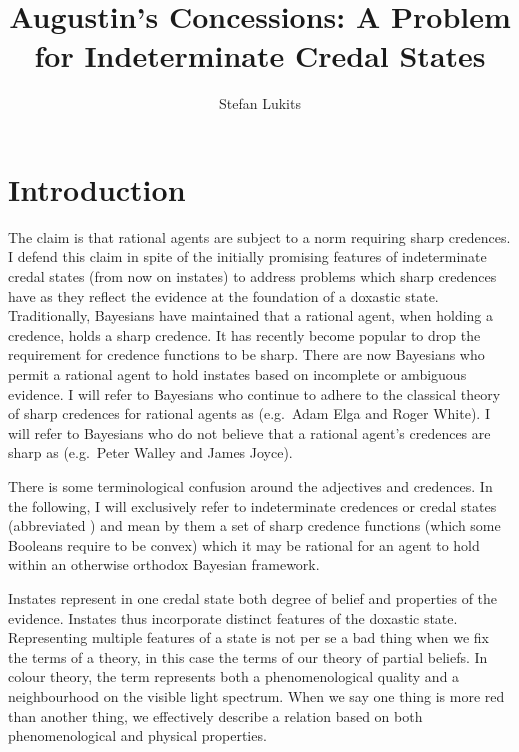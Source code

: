 \documentclass[11pt]{article}
\begin{document}

\title{Augustin's Concessions: A Problem for Indeterminate Credal States}
\author{Stefan Lukits}
\date{}
\maketitle


\section{Introduction}
\label{Introduction}

The claim is that rational agents are subject to a norm requiring
sharp credences. I defend this claim in spite of the initially
promising features of indeterminate credal states (from now on
instates) to address problems which sharp credences have as they
reflect the evidence at the foundation of a doxastic state.
Traditionally, Bayesians have maintained that a rational agent, when
holding a credence, holds a sharp credence. It has recently become
popular to drop the requirement for credence functions to be sharp.
There are now Bayesians who permit a rational agent to hold instates
based on incomplete or ambiguous evidence. I will refer to Bayesians
who continue to adhere to the classical theory of sharp credences for
rational agents as  (e.g.\ Adam Elga and Roger
White). I will refer to Bayesians who do not believe that a rational
agent's credences are sharp as  (e.g.\ Peter Walley
and James Joyce).

There is some terminological confusion around the adjectives
  and  credences.
In the following, I will exclusively refer to indeterminate credences
or credal states (abbreviated ) and mean by them a set
of sharp credence functions (which some Booleans require to be convex)
which it may be rational for an agent to hold within an otherwise
orthodox Bayesian framework.

Instates represent in one credal state both degree of belief and
properties of the evidence. Instates thus incorporate distinct
features of the doxastic state. Representing multiple features of a
state is not per se a bad thing when we fix the terms of a theory, in
this case the terms of our theory of partial beliefs. In colour
theory, the term  represents both a phenomenological
quality and a neighbourhood on the visible light spectrum. When we say
one thing is more red than another thing, we effectively describe a
relation based on both phenomenological and physical properties.
\end{document}
